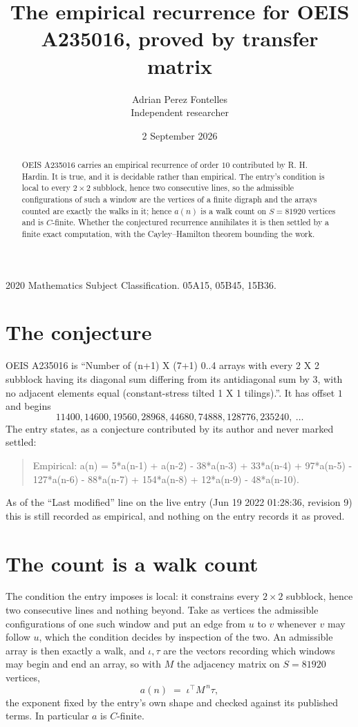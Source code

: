 \documentclass[11pt,a4paper]{article}
\title{The empirical recurrence for OEIS A235016, proved by transfer matrix}
\author{Adrian Perez Fontelles\\ \small Independent researcher}
\date{2 September 2026}
\theoremstyle{plain}
\theoremstyle{definition}
\begin{document}
\maketitle

\begin{abstract}
OEIS A235016 carries an empirical recurrence of order $10$ contributed by R. H. Hardin. It is
true, and it is decidable rather than empirical. The entry's condition is local to every $2\times2$ subblock, hence two consecutive lines, so
the admissible configurations of such a window are the vertices of a finite digraph and the
arrays counted are exactly the walks in it; hence $a(n)$ is a walk count on $S=81920$ vertices
and is $C$-finite. Whether the conjectured recurrence annihilates it is then settled by a
finite exact computation, with the Cayley--Hamilton theorem bounding the work.
\end{abstract}

\noindent\small 2020 Mathematics Subject Classification. 05A15, 05B45, 15B36.\normalsize

\section{The conjecture}

OEIS A235016 is ``Number of (n+1) X (7+1) 0..4 arrays with every 2 X 2 subblock having its diagonal sum differing from its antidiagonal sum by 3, with no adjacent elements equal (constant-stress tilted 1 X 1 tilings).''. It has offset $1$ and begins
\[
11400, 14600, 19560, 28968, 44680, 74888, 128776, 235240,\ \dots
\]
The entry states, as a conjecture contributed by its author and never marked settled:
\begin{quote}
Empirical: a(n) = 5*a(n-1) + a(n-2) - 38*a(n-3) + 33*a(n-4) + 97*a(n-5) - 127*a(n-6) - 88*a(n-7) + 154*a(n-8) + 12*a(n-9) - 48*a(n-10).
\end{quote}
As of the ``Last modified'' line on the live entry (Jun 19 2022 01:28:36, revision 9) this is still
recorded as empirical, and nothing on the entry records it as proved.

\section{The count is a walk count}

The condition the entry imposes is local: it constrains every $2\times2$ subblock, hence two consecutive lines and nothing beyond. Take as vertices the admissible configurations of one such window and put an edge from $u$ to $v$ whenever $v$ may follow $u$, which the condition decides by inspection of the two.
An admissible array is then exactly a walk, and $\iota,\tau$ are the vectors recording which windows may begin and end an array, so with $M$ the adjacency matrix on $S=81920$ vertices,
\[
a(n)\;=\;\iota^{\!\top}M^{\,n}\tau ,
\]
the exponent fixed by the entry's own shape and checked against its published terms. In
particular $a$ is $C$-finite.
\end{document}
